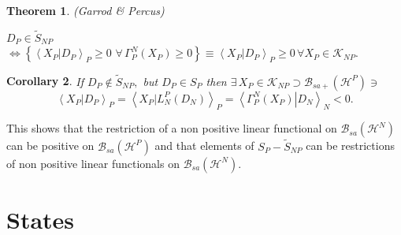 \documentclass[aps,preprint]{revtex4}%
\newtheorem{theorem}{Theorem}
\newtheorem{corollary}[theorem]{Corollary}
\begin{document}
\begin{theorem}
(Garrod \& Percus)
\end{theorem}

$D_{P}\in\tilde{S}_{NP}$ $\Longleftrightarrow\left\{  \left\langle \left.
X_{P}\right\vert D_{P}\right\rangle _{P}\geq0\,\,\forall\,\Gamma_{P}%
^{N}\left(  X_{P}\right)  \geq0\right\}  \equiv\left\langle \left.
X_{P}\right\vert D_{P}\right\rangle _{P}\geq0\,\forall X_{P}\in\mathcal{K}%
_{NP}.$

\begin{corollary}
If $D_{P}\notin\tilde{S}_{NP},$ but $D_{P}\in S_{P}$ then $\exists\,X_{P}%
\in\mathcal{K}_{NP}\supset\mathcal{B}_{sa+}\left(  \mathcal{H}^{P}\right)
\ni$
\begin{equation}
\left\langle \left.  X_{P}\right\vert D_{P}\right\rangle _{P}=\left\langle
\left.  X_{P}\right\vert L_{N}^{P}\left(  D_{N}\right)  \right\rangle
_{P}=\left\langle \left.  \Gamma_{P}^{N}\left(  X_{P}\right)  \right\vert
D_{N}\right\rangle _{N}<0.
\end{equation}

\end{corollary}

This shows that the restriction of a non positive linear functional on
$\mathcal{B}_{sa}\left(  \mathcal{H}^{N}\right)  $ can be positive on
$\mathcal{B}_{sa}\left(  \mathcal{H}^{P}\right)  $ and that elements of
$S_{P}-\tilde{S}_{NP}$ can be restrictions of non positive linear functionals
on $\mathcal{B}_{sa}\left(  \mathcal{H}^{N}\right)  .$

\section{States}
\end{document}
